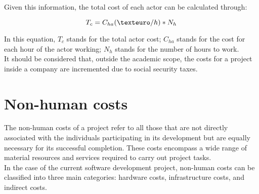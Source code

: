 \documentclass[../memory.tex]{subfiles}
\begin{document}
\vspace*{8pt}
Given this information, the total cost of each actor can be calculated through:
\begin{center}
	\[ T_c = C_{ha}(\texteuro/h) * N_h \]
\end{center}
In this equation, $T_c$ stands for the total actor cost; $C_{ha}$ stands for the
cost for each hour of the actor working; $N_h$ stands for the number of hours to
work.
\\[8pt]
It should be considered that, outside the academic scope, the costs for a
project inside a company are incremented due to social security taxes.
\section{Non-human costs}
The non-human costs of a project refer to all those that are not directly
associated with the individuals participating in its development but are equally
necessary for its successful completion. These costs encompass a wide range of
material resources and services required to carry out project tasks.
\\
In the case of the current software development project, non-human costs can be
classified into three main categories: hardware costs, infrastructure costs, and
indirect costs.
\end{document}
